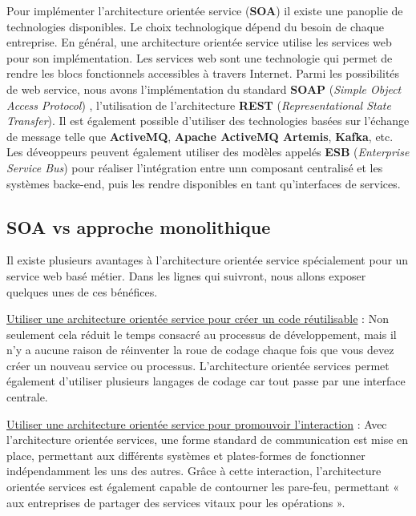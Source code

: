 \documentclass[
]{book}
\theoremstyle{definition}
\theoremstyle{definition}
\theoremstyle{definition}
\theoremstyle{definition}
\theoremstyle{remark}
\begin{document}
Pour implémenter l'architecture orientée service (\textbf{SOA}) il existe une panoplie de technologies disponibles. Le choix technologique dépend du besoin de chaque entreprise. En général, une architecture orientée service utilise les services web pour son implémentation. Les services web sont une technologie qui permet de rendre les blocs fonctionnels accessibles à travers Internet. Parmi les possibilités de web service, nous avons l'implémentation du standard \textbf{SOAP} (\emph{Simple Object Access Protocol}) , l'utilisation de l'architecture \textbf{REST} (\emph{Representational State Transfer}). Il est également possible d'utiliser des technologies basées sur l'échange de message telle que \textbf{ActiveMQ}, \textbf{Apache ActiveMQ Artemis}, \textbf{Kafka}, etc. Les déveoppeurs peuvent également utiliser des modèles appelés \textbf{ESB} (\emph{Enterprise Service Bus}) pour réaliser l'intégration entre unn composant centralisé et les systèmes backe-end, puis les rendre disponibles en tant qu'interfaces de services.

\hypertarget{soa-vs-approche-monolithique}{%
\subsection{SOA vs approche monolithique}\label{soa-vs-approche-monolithique}}

Il existe plusieurs avantages à l'architecture orientée service spécialement pour un service web basé métier. Dans les lignes qui suivront, nous allons exposer quelques unes de ces bénéfices.

\underline{Utiliser une architecture orientée service pour créer un code réutilisable} : Non seulement cela réduit le temps consacré au processus de développement, mais il n'y a aucune raison de réinventer la roue de codage chaque fois que vous devez créer un nouveau service ou processus. L'architecture orientée services permet également d'utiliser plusieurs langages de codage car tout passe par une interface centrale.

\underline{Utiliser une architecture orientée service pour promouvoir l'interaction} : Avec l'architecture orientée services, une forme standard de communication est mise en place, permettant aux différents systèmes et plates-formes de fonctionner indépendamment les uns des autres. Grâce à cette interaction, l'architecture orientée services est également capable de contourner les pare-feu, permettant « aux entreprises de partager des services vitaux pour les opérations ».
\end{document}
